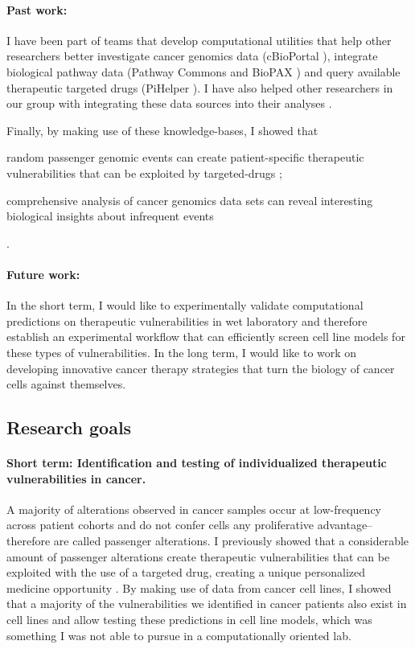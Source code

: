 \documentclass[11pt,letterpaper]{article}
\begin{document}
\paragraph{Past work: }I have been part of teams that develop computational utilities that help other researchers better 
investigate cancer genomics data (cBioPortal \cite{gao2014cbioportal, cerami2012cbio}),
integrate biological pathway data (Pathway Commons and BioPAX \cite{demir2013using,babur2014integrating})
and query available therapeutic targeted drugs (PiHelper \cite{aksoy2013pihelper}).
I have also helped other researchers in our group with integrating these data sources into their analyses \cite{ciriello2013emerging,korkut2014perturbation,babur2014systematic}.

Finally, by making use of these knowledge-bases, 
I showed that 
\begin{inparaenum}[(i)]
 \item random passenger genomic events can create patient-specific therapeutic vulnerabilities that can be exploited by targeted-drugs \cite{aksoy2014prediction};
 \item comprehensive analysis of cancer genomics data sets can reveal interesting biological insights about infrequent events \cite{aksoy2014cancer}
\end{inparaenum}.

\paragraph{Future work:} 
In the short term, I would like to experimentally validate computational predictions on therapeutic vulnerabilities in wet laboratory
and therefore establish an experimental workflow that can efficiently screen cell line models for these types of vulnerabilities.
In the long term, I would like to work on developing innovative cancer therapy strategies that turn the biology of cancer cells against themselves.

\subsection*{Research goals}
\paragraph{Short term: Identification and testing of individualized therapeutic vulnerabilities in cancer.}
A majority of alterations observed in cancer samples occur at low-frequency across patient cohorts
and do not confer cells any proliferative advantage--therefore are called passenger alterations.
I previously showed that a considerable amount of passenger alterations create therapeutic vulnerabilities that can be exploited with the use of a targeted drug, creating a unique personalized medicine opportunity \cite{aksoy2014prediction}.
By making use of data from cancer cell lines,
I showed that a majority of the vulnerabilities we identified in cancer patients also exist in cell lines
and allow testing these predictions in cell line models, which was something I was not able to pursue in a computationally oriented lab.
\end{document}
